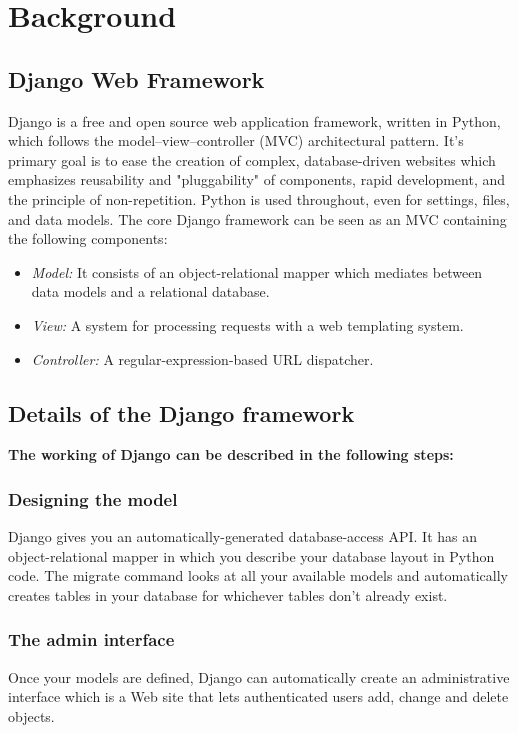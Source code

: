 \section{Background}

\subsection{Django Web Framework}

\hspace{0.35cm} Django is a free and open source web application framework, written in Python, which follows the model–view–controller (MVC) architectural pattern.
It's primary goal is to ease the creation of complex, database-driven websites which emphasizes reusability and "pluggability" of components, rapid development, and the principle of non-repetition. Python is used throughout, even for settings, files, and data models. The core Django framework can be seen as an MVC containing the following components:
\begin{itemize}
	\item \emph{Model:} It consists of an object-relational mapper which mediates between data models and a relational database.
	\item \emph{View:} A system for processing requests with a web templating system.
	\item \emph{Controller:} A regular-expression-based URL dispatcher.
\end{itemize}

\subsection*{Details of the Django framework}
\textbf{The working of Django can be described in the following steps:}

\subsubsection*{Designing the model}
\hspace{0.35cm} Django gives you an automatically-generated database-access API. It has an object-relational mapper in which you describe your database layout in Python code. The migrate command looks at all your available models and automatically creates tables in your database for whichever tables don’t already exist.

\subsubsection*{The admin interface}
\hspace{0.35cm} Once your models are defined, Django can automatically create an administrative interface which is a Web site that lets authenticated users add, change and delete objects.

